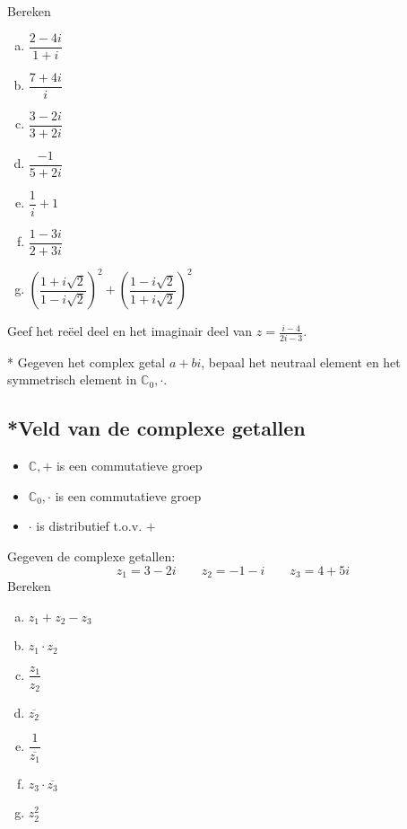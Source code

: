 \documentclass[12pt,twoside]{article}
\begin{document}
\begin{oefening}
  Bereken
  \begin{multicols}{2}
  \begin{enumerate}[(a)]
  \itemsep1em
  \item $\displaystyle \dfrac{2-4i}{1+i}$
  \item $\displaystyle \dfrac{7+4i}{i}$
  \item $\displaystyle \dfrac{3-2i}{3+2i}$
  \item $\displaystyle \dfrac{-1}{5+2i}$
  \item $\displaystyle \dfrac{1}{i}+1$
  \item $\displaystyle \dfrac{1-3i}{2+3i}$
  \item $\displaystyle \left(\dfrac{1+i\sqrt{2}}{1-i\sqrt{2}}\right)^2+\left(\dfrac{1-i\sqrt{2}}{1+i\sqrt{2}}\right)^2$
  \end{enumerate}
  \end{multicols}
\end{oefening}

\begin{oefening}
  Geef het reëel deel en het imaginair deel van $z=\frac{i-4}{2i-3}$.
\end{oefening}

\begin{oefening}*
  Gegeven het complex getal $a+bi$, bepaal het neutraal element en het symmetrisch element in $\mathbb{C}_0, \cdot$.
\end{oefening}

\subsection{*Veld van de complexe getallen}

\begin{itemize}
  \item $\mathbb{C},+$ is een commutatieve groep
  \item $\mathbb{C}_0,\cdot$ is een commutatieve groep
  \item $\cdot$ is distributief t.o.v. $+$
\end{itemize}

\begin{oefening}
  Gegeven de complexe getallen:
  $$z_1=3-2i \qquad z_2=-1-i \qquad z_3=4+5i$$
  Bereken
  \begin{multicols}{2}
    \begin{enumerate}[(a)]
      \itemsep 1em
    \item $\displaystyle z_1+z_2-z_3$
    \item $\displaystyle z_1\cdot z_2$
    \item $\displaystyle \dfrac{z_1}{z_2}$
    \item $\displaystyle \overline{z_2}$
    \item $\displaystyle \dfrac{1}{\overline{z_1}}$
    \item $\displaystyle z_3\cdot \overline{z_3}$
    \item $\displaystyle z_2^2$
    \end{enumerate}
  \end{multicols}
\end{oefening}
\end{document}
